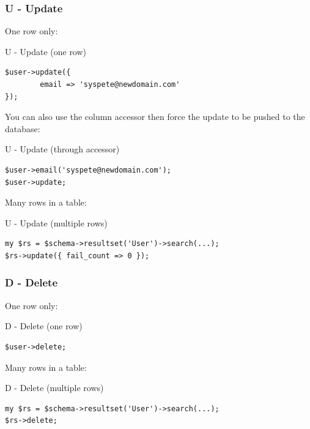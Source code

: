 
\subsubsection{U - Update}

One row only:

\begin{frame}[fragile]{U - Update (one row)}
\begin{lstlisting}
$user->update({
        email => 'syspete@newdomain.com'
});
\end{lstlisting}
\end{frame}

You can also use the column accessor then force the update to be pushed to
the database:

\begin{frame}[fragile]{U - Update (through accessor)}
\begin{lstlisting}
$user->email('syspete@newdomain.com');
$user->update;
\end{lstlisting}
\end{frame}

Many rows in a table:

\begin{frame}[fragile]{U - Update (multiple rows)}
\begin{lstlisting}
my $rs = $schema->resultset('User')->search(...);
$rs->update({ fail_count => 0 });
\end{lstlisting}
\end{frame}

\subsubsection{D - Delete}

One row only:

\begin{frame}[fragile]{D - Delete (one row)}
\begin{lstlisting}
$user->delete;
\end{lstlisting}
\end{frame}

Many rows in a table:

\begin{frame}[fragile]{D - Delete (multiple rows)}
\begin{lstlisting}
my $rs = $schema->resultset('User')->search(...);
$rs->delete;
\end{lstlisting}
\end{frame}

